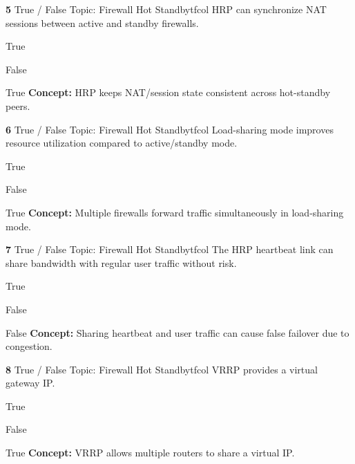 \documentclass[10pt,a4paper]{article}
\begin{document}
\begin{qcard}{\color{white}\textbf{5} \hfill \small True / False \textbar{} Topic: Firewall Hot Standby}{tfcol}
HRP can synchronize NAT sessions between active and standby firewalls.

\begin{qoptions}
\item True
\item False
\end{qoptions}
\begin{explainbox}{True}
\textbf{Concept:} HRP keeps NAT/session state consistent across hot-standby peers.
\end{explainbox}
\end{qcard}

\begin{qcard}{\color{white}\textbf{6} \hfill \small True / False \textbar{} Topic: Firewall Hot Standby}{tfcol}
Load-sharing mode improves resource utilization compared to active/standby mode.

\begin{qoptions}
\item True
\item False
\end{qoptions}
\begin{explainbox}{True}
\textbf{Concept:} Multiple firewalls forward traffic simultaneously in load-sharing mode.
\end{explainbox}
\end{qcard}

\begin{qcard}{\color{white}\textbf{7} \hfill \small True / False \textbar{} Topic: Firewall Hot Standby}{tfcol}
The HRP heartbeat link can share bandwidth with regular user traffic without risk.

\begin{qoptions}
\item True
\item False
\end{qoptions}
\begin{explainbox}{False}
\textbf{Concept:} Sharing heartbeat and user traffic can cause false failover due to congestion.
\end{explainbox}
\end{qcard}

\begin{qcard}{\color{white}\textbf{8} \hfill \small True / False \textbar{} Topic: Firewall Hot Standby}{tfcol}
VRRP provides a virtual gateway IP.

\begin{qoptions}
\item True
\item False
\end{qoptions}
\begin{explainbox}{True}
\textbf{Concept:} VRRP allows multiple routers to share a virtual IP.
\end{explainbox}
\end{qcard}
\end{document}
